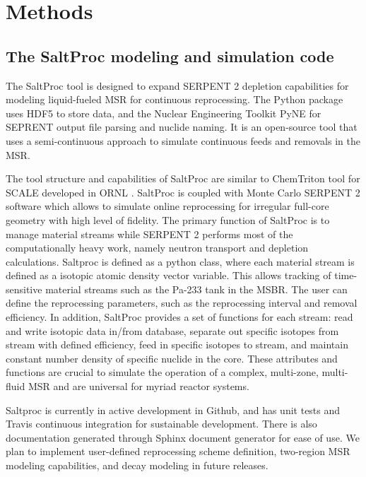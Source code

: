 
\section{Methods}


\subsection{The SaltProc modeling and simulation code}

The SaltProc tool \cite{andrei_rykhlevskii_arfc/saltproc:_201*} is designed to expand SERPENT 2
 depletion capabilities for modeling liquid-fueled \gls{MSR} for continuous reprocessing.
The Python package uses HDF5 \cite{the_hdf_group_hierarchial_1997} to store data, and the Nuclear Engineering Toolkit PyNE \cite{scopatz_pyne:_2012}
for SEPRENT output file parsing and nuclide naming. It is an open-source tool that uses a semi-continuous approach to 
simulate continuous feeds and removals in the \gls{MSR}. 

The tool structure and capabilities of SaltProc are similar to ChemTriton tool for SCALE
developed in \gls{ORNL} \cite{powers_new_2013}. SaltProc is coupled with Monte Carlo SERPENT 2
software which allows to simulate online reprocessing for irregular full-core geometry with 
high level of fidelity.  The primary function of SaltProc is to manage material streams while
SERPENT 2 performs most of the computationally heavy work, namely neutron transport and depletion
calculations. Saltproc is defined as a 
python class, where each material stream is defined as a isotopic atomic density
vector variable. This allows tracking of time-sensitive material streams such as the
Pa-233 tank in the \gls{MSBR}. The user can define the reprocessing parameters, such as the 
reprocessing interval and removal efficiency.  In addition, SaltProc provides a set of functions 
for each stream: read and write isotopic data in/from database, separate out specific isotopes 
from stream with defined efficiency, feed in specific isotopes to stream, and maintain constant 
number density of specific nuclide in the core. These attributes and functions are crucial to 
simulate the operation of a complex, multi-zone, multi-fluid \gls{MSR} and are universal for 
myriad reactor systems.

Saltproc is currently in active development in Github, and has unit tests and
Travis continuous integration for sustainable development. There is also documentation
generated through Sphinx document generator for ease of use. We plan to implement
user-defined reprocessing scheme definition, two-region \gls{MSR} modeling capabilities,
and decay modeling in future releases.

